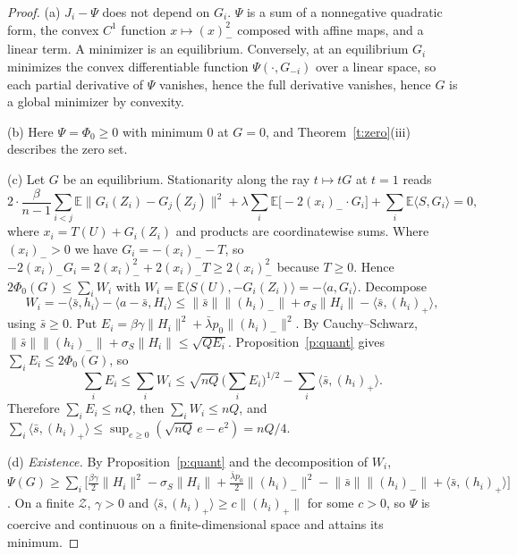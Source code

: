 \documentclass[11pt]{article}
\theoremstyle{definition}
\theoremstyle{remark}
\newcommand{\E}{\mathbb{E}}
\newcommand{\cZ}{\mathcal{Z}}
\newcommand{\ip}[2]{\langle #1,#2\rangle}
\newcommand{\norm}[1]{\lVert #1\rVert}
\newcommand{\negp}[1]{(#1)_{-}}
\newcommand{\posp}[1]{(#1)_{+}}
\newcommand{\lbar}{\bar\lambda}
\begin{document}
\begin{proof}
(a) $J_i-\Psi$ does not depend on $G_i$. $\Psi$ is a sum of a nonnegative quadratic form, the convex $C^1$ function $x\mapsto\negp{x}^2$ composed with affine maps, and a linear term. A minimizer is an equilibrium. Conversely, at an equilibrium $G_i$ minimizes the convex differentiable function $\Psi(\cdot,G_{-i})$ over a linear space, so each partial derivative of $\Psi$ vanishes, hence the full derivative vanishes, hence $G$ is a global minimizer by convexity.

(b) Here $\Psi=\Phi_0\ge0$ with minimum $0$ at $G=0$, and Theorem~\ref{t:zero}(iii) describes the zero set.

(c) Let $G$ be an equilibrium. Stationarity along the ray $t\mapsto tG$ at $t=1$ reads
\[
2\cdot\frac{\beta}{n-1}\sum_{i<j}\E\norm{G_i(Z_i)-G_j(Z_j)}^2+\lambda\sum_i\E\big[-2\negp{x_i}\cdot G_i\big]+\sum_i\E\ip{S}{G_i}=0,
\]
where $x_i=T(U)+G_i(Z_i)$ and products are coordinatewise sums. Where $\negp{x_i}>0$ we have $G_i=-\negp{x_i}-T$, so $-2\negp{x_i}G_i=2\negp{x_i}^2+2\negp{x_i}T\ge2\negp{x_i}^2$ because $T\ge 0$. Hence $2\Phi_0(G)\le\sum_iW_i$ with $W_i=\E\ip{S(U)}{-G_i(Z_i)}=-\ip{a}{G_i}$. Decompose
\[
W_i=-\ip{\bar s}{h_i}-\ip{a-\bar s}{H_i}\le\norm{\bar s}\norm{\negp{h_i}}+\sigma_S\norm{H_i}-\ip{\bar s}{\posp{h_i}} ,
\]
using $\bar s\ge0$. Put $E_i=\beta\gamma\norm{H_i}^2+\lbar p_0\norm{\negp{h_i}}^2$. By Cauchy--Schwarz, $\norm{\bar s}\norm{\negp{h_i}}+\sigma_S\norm{H_i}\le\sqrt{Q E_i}$. Proposition~\ref{p:quant} gives $\sum_iE_i\le2\Phi_0(G)$, so
\[
\sum_iE_i\le\sum_iW_i\le\sqrt{nQ}\,\Big(\sum_iE_i\Big)^{1/2}-\sum_i\ip{\bar s}{\posp{h_i}} .
\]
Therefore $\sum_iE_i\le nQ$, then $\sum_iW_i\le nQ$, and $\sum_i\ip{\bar s}{\posp{h_i}}\le\sup_{e\ge 0}(\sqrt{nQ}\,e-e^2)=nQ/4$.

(d) \emph{Existence.} By Proposition~\ref{p:quant} and the decomposition of $W_i$,
$\Psi(G)\ge\sum_i\big[\tfrac{\beta\gamma}{2}\norm{H_i}^2-\sigma_S\norm{H_i}+\tfrac{\lbar p_0}{2}\norm{\negp{h_i}}^2-\norm{\bar s}\norm{\negp{h_i}}+\ip{\bar s}{\posp{h_i}}\big]$.
On a finite $\cZ$, $\gamma>0$ and $\ip{\bar s}{\posp{h_i}}\ge c\norm{\posp{h_i}}$ for some $c>0$, so $\Psi$ is coercive and continuous on a finite-dimensional space and attains its minimum.


\end{proof}
\end{document}
